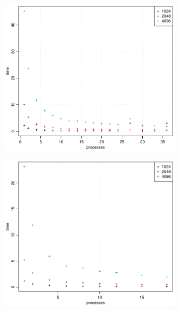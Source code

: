 \documentclass[norsk]{article} %
\numberwithin{equation}{section} %
\numberwithin{figure}{section} %
\numberwithin{table}{section} %
\begin{document}
%
\begin{figure}[h!]
  \centering
  \begin{subfigure}[b]{0.48\textwidth}
    \includegraphics[width=\textwidth]{./Figures/taskbTimeProc1.pdf}
  \end{subfigure}%
  \quad
  \begin{subfigure}[b]{0.48\textwidth}
    \includegraphics[width=\textwidth]{./Figures/taskbTimeProc2.pdf}
  \end{subfigure}
  \quad

\end{figure}
\end{document}
